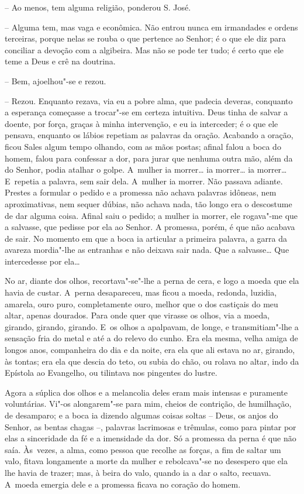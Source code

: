-- Ao menos, tem alguma religião, ponderou S. José.

-- Alguma tem, mas vaga e econômica. Não entrou nunca em irmandades e
ordens terceiras, porque nelas se rouba o que pertence ao Senhor; é o
que ele diz para conciliar a devoção com a algibeira. Mas não se pode
ter tudo; é certo que ele teme a Deus e crê na doutrina.

-- Bem, ajoelhou"-se e rezou.

-- Rezou. Enquanto rezava, via eu a pobre alma, que padecia deveras,
conquanto a esperança começasse a trocar"-se em certeza intuitiva. Deus
tinha de salvar a doente, por força, graças à minha intervenção, e eu ia
interceder; é o que ele pensava, enquanto os lábios repetiam as palavras
da oração. Acabando a oração, ficou Sales algum tempo olhando, com as
mãos postas; afinal falou a boca do homem, falou para confessar a dor,
para jurar que nenhuma outra mão, além da do Senhor, podia atalhar o
golpe. A~mulher ia morrer\ldots{} ia morrer\ldots{} ia morrer\ldots{} E~repetia a
palavra, sem sair dela. A~mulher ia morrer. Não passava adiante. Prestes
a formular o pedido e a promessa não achava palavras idôneas, nem
aproximativas, nem sequer dúbias, não achava nada, tão longo era o
descostume de dar alguma coisa. Afinal saiu o pedido; a mulher ia
morrer, ele rogava"-me que a salvasse, que pedisse por ela ao Senhor. A
promessa, porém, é que não acabava de sair. No momento em que a boca ia
articular a primeira palavra, a garra da avareza mordia"-lhe as entranhas
e não deixava sair nada. Que a salvasse\ldots{} Que intercedesse por ela\ldots{}

No ar, diante dos olhos, recortava"-se"-lhe a perna de cera, e logo a
moeda que ela havia de custar. A~perna desapareceu, mas ficou a moeda,
redonda, luzidia, amarela, ouro puro, completamente ouro, melhor que o
dos castiçais do meu altar, apenas dourados. Para onde quer que virasse
os olhos, via a moeda, girando, girando, girando. E~os olhos a
apalpavam, de longe, e transmitiam"-lhe a sensação fria do metal e até a
do relevo do cunho. Era ela mesma, velha amiga de longos anos,
companheira do dia e da noite, era ela que ali estava no ar, girando, às
tontas; era ela que descia do teto, ou subia do chão, ou rolava no
altar, indo da Epístola ao Evangelho, ou tilintava nos pingentes do
lustre.

Agora a súplica dos olhos e a melancolia deles eram mais intensas e
puramente voluntárias. Vi"-os alongarem"-se para mim, cheios de contrição,
de humilhação, de desamparo; e a boca ia dizendo algumas coisas soltas
-- Deus, os anjos do Senhor, as bentas chagas --, palavras lacrimosas e
trêmulas, como para pintar por elas a sinceridade da fé e a imensidade
da dor. Só a promessa da perna é que não saía. Às~vezes, a alma, como
pessoa que recolhe as forças, a fim de saltar um valo, fitava longamente
a morte da mulher e rebolcava"-se no desespero que ela lhe havia de
trazer; mas, à beira do valo, quando ia a dar o salto, recuava. A~moeda
emergia dele e a promessa ficava no coração do homem.

